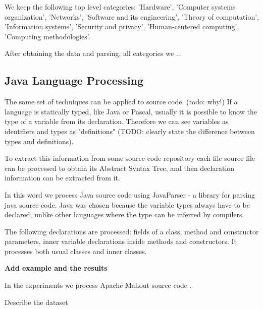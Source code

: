 We keep the following top level categories:
'Hardware', 'Computer systems organization', 'Networks', 'Software and its engineering',
'Theory of computation', 'Information systems', 'Security and privacy', 
'Human-centered computing', 'Computing methodologies'.

After obtaining the data and parsing, all categories we ...


\subsection{Java Language Processing}

The same set of techniques can be applied to source code.
(todo: why!)
If a language 
is statically typed, like Java or Pascal, usually it is possible to know the
type of a variable from its declaration. Therefore we can see 
variables as identifiers and types as "definitions" (TODO: clearly state 
the difference between types and definitions).

To extract this information from some source code repository each file source
file can be processed to obtain its Abstract Syntax Tree, and then 
declaration information can be extracted from it. 


In this word we process Java source code using JavaParser \cite{javaparser} - 
a library for parsing java source code. Java was chosen because the variable 
types always have to be declared, unlike other languages where the type 
can be inferred by compilers. 

The following declarations are processed: fields of a class, method and 
constructor parameters, inner variable declarations inside 
methods and constructors. It processes both usual classes and inner classes. 

\textbf{Add example and the results}


In the experiments we process Apache Mahout source code \cite{mahout}. 

Describe the dataset
